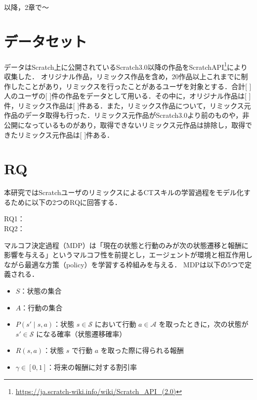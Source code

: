 \documentclass[submit,techrep,noauthor]{ipsj}
\begin{document}
以降，2章で〜

\section{データセット}
データはScratch上に公開されているScratch3.0以降の作品をScratchAPI\footnote{\url{https://ja.scratch-wiki.info/wiki/Scratch_API_(2.0)}}により収集した．
オリジナル作品，リミックス作品を含め，20作品以上これまでに制作したことがあり，リミックスを行ったことがあるユーザを対象とする．合計[ ]人のユーザの[ ]件の作品をデータとして用いる．その中に，オリジナル作品は[ ]件，リミックス作品は[ ]件ある．また，リミックス作品について，リミックス元作品のデータ取得も行った．リミックス元作品がScratch3.0より前のものや，非公開になっているものがあり，取得できないリミックス元作品は排除し，取得できたリミックス元作品は[ ]件ある．

\section{RQ}
本研究ではScratchユーザのリミックスによるCTスキルの学習過程をモデル化するために以下の2つのRQに回答する．
\begin{description}
  \item[RQ1：] 
  \item[RQ2：] 
\end{description}

マルコフ決定過程（MDP）は「現在の状態と行動のみが次の状態遷移と報酬に影響を与える」というマルコフ性を前提とし，エージェントが環境と相互作用しながら最適な方策（policy）を学習する枠組みを与える．
MDPは以下の5つで定義される．


\begin{itemize}
    \item $S$：状態の集合
    \item $A$：行動の集合
    \item $P(s' \mid s, a)$：状態 $s \in \mathcal{S}$ において行動 $a \in \mathcal{A}$ を取ったときに，次の状態が $s' \in \mathcal{S}$ になる確率（状態遷移確率）
    \item $R(s, a)$：状態 $s$ で行動 $a$ を取った際に得られる報酬
    \item $\gamma \in [0, 1]$：将来の報酬に対する割引率
\end{itemize}
\end{document}
